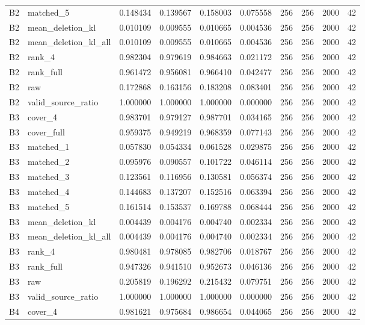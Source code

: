 \begin{tabular}{llrrrrrrrr}
B2 & matched_5 & 0.148434 & 0.139567 & 0.158003 & 0.075558 & 256 & 256 & 2000 & 42 \\
B2 & mean_deletion_kl & 0.010109 & 0.009555 & 0.010665 & 0.004536 & 256 & 256 & 2000 & 42 \\
B2 & mean_deletion_kl_all & 0.010109 & 0.009555 & 0.010665 & 0.004536 & 256 & 256 & 2000 & 42 \\
B2 & rank_4 & 0.982304 & 0.979619 & 0.984663 & 0.021172 & 256 & 256 & 2000 & 42 \\
B2 & rank_full & 0.961472 & 0.956081 & 0.966410 & 0.042477 & 256 & 256 & 2000 & 42 \\
B2 & raw & 0.172868 & 0.163156 & 0.183208 & 0.083401 & 256 & 256 & 2000 & 42 \\
B2 & valid_source_ratio & 1.000000 & 1.000000 & 1.000000 & 0.000000 & 256 & 256 & 2000 & 42 \\
B3 & cover_4 & 0.983701 & 0.979127 & 0.987701 & 0.034165 & 256 & 256 & 2000 & 42 \\
B3 & cover_full & 0.959375 & 0.949219 & 0.968359 & 0.077143 & 256 & 256 & 2000 & 42 \\
B3 & matched_1 & 0.057830 & 0.054334 & 0.061528 & 0.029875 & 256 & 256 & 2000 & 42 \\
B3 & matched_2 & 0.095976 & 0.090557 & 0.101722 & 0.046114 & 256 & 256 & 2000 & 42 \\
B3 & matched_3 & 0.123561 & 0.116956 & 0.130581 & 0.056374 & 256 & 256 & 2000 & 42 \\
B3 & matched_4 & 0.144683 & 0.137207 & 0.152516 & 0.063394 & 256 & 256 & 2000 & 42 \\
B3 & matched_5 & 0.161514 & 0.153537 & 0.169788 & 0.068444 & 256 & 256 & 2000 & 42 \\
B3 & mean_deletion_kl & 0.004439 & 0.004176 & 0.004740 & 0.002334 & 256 & 256 & 2000 & 42 \\
B3 & mean_deletion_kl_all & 0.004439 & 0.004176 & 0.004740 & 0.002334 & 256 & 256 & 2000 & 42 \\
B3 & rank_4 & 0.980481 & 0.978085 & 0.982706 & 0.018767 & 256 & 256 & 2000 & 42 \\
B3 & rank_full & 0.947326 & 0.941510 & 0.952673 & 0.046136 & 256 & 256 & 2000 & 42 \\
B3 & raw & 0.205819 & 0.196292 & 0.215432 & 0.079751 & 256 & 256 & 2000 & 42 \\
B3 & valid_source_ratio & 1.000000 & 1.000000 & 1.000000 & 0.000000 & 256 & 256 & 2000 & 42 \\
B4 & cover_4 & 0.981621 & 0.975684 & 0.986654 & 0.044065 & 256 & 256 & 2000 & 42 \\

\end{tabular}

